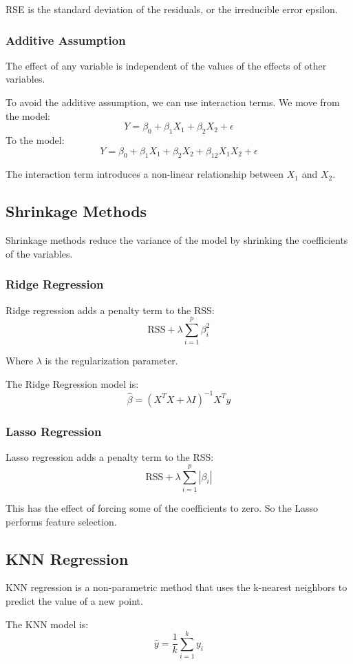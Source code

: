 RSE is the standard deviation of the residuals, or the irreducible error epsilon.

\subsubsection*{Additive Assumption}
The effect of any variable is independent of the values of the effects of other variables.

To avoid the additive assumption, we can use interaction terms. We move from the model:
$$Y = \beta_0 + \beta_1 X_1 + \beta_2 X_2 + \epsilon$$
To the model:
$$Y = \beta_0 + \beta_1 X_1 + \beta_2 X_2 + \beta_{12} X_1 X_2 + \epsilon$$

The interaction term introduces a non-linear relationship between $X_1$ and $X_2$.

\subsection*{Shrinkage Methods}
Shrinkage methods reduce the variance of the model by shrinking the coefficients of the variables.

\subsubsection*{Ridge Regression}
Ridge regression adds a penalty term to the RSS:
$$\text{RSS} + \lambda \sum_{i=1}^{p} \beta_i^2$$

Where $\lambda$ is the regularization parameter.

The Ridge Regression model is:
$$\hat{\beta} = (X^T X + \lambda I)^{-1} X^T y$$

\subsubsection*{Lasso Regression}
Lasso regression adds a penalty term to the RSS:
$$\text{RSS} + \lambda \sum_{i=1}^{p} |\beta_i|$$

This has the effect of forcing some of the coefficients to zero. So the Lasso performs feature selection.

\subsection*{KNN Regression}
KNN regression is a non-parametric method that uses the k-nearest neighbors to predict the value of a new point.

The KNN model is:
$$\hat{y} = \frac{1}{k} \sum_{i=1}^{k} y_i$$

